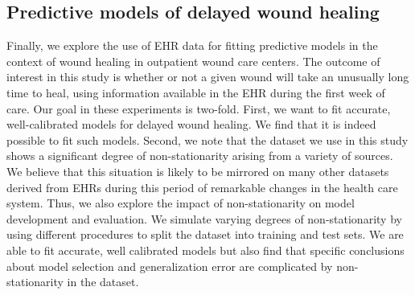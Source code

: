 \subsection{Predictive models of delayed wound healing}
Finally, we explore the use of EHR data for fitting predictive models
in the context of wound healing in outpatient wound care centers.  The
outcome of interest in this study is whether or not a given wound will
take an unusually long time to heal, using information available in
the EHR during the first week of care.  Our goal in these experiments
is two-fold.  First, we want to fit accurate, well-calibrated models
for delayed wound healing.  We find that it is indeed possible to fit
such models.  Second, we note that the dataset we use in this study
shows a significant degree of non-stationarity arising from a variety
of sources.  We believe that this situation is likely to be mirrored
on many other datasets derived from EHRs during this period of
remarkable changes in the health care system.  Thus, we also explore
the impact of non-stationarity on model development and evaluation.
We simulate varying degrees of non-stationarity by using different
procedures to split the dataset into training and test sets.  We are
able to fit accurate, well calibrated models but also find that specific
conclusions about model selection and generalization error are
complicated by non-stationarity in the dataset.  



